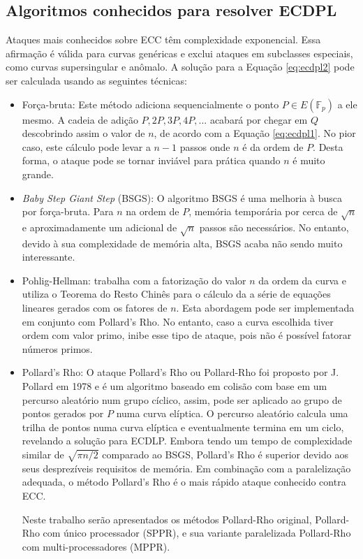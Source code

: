 %
%
\subsection{Algoritmos conhecidos para resolver ECDPL}
Ataques mais conhecidos sobre ECC têm complexidade exponencial. Essa afirmação é válida para curvas genéricas e exclui ataques em subclasses especiais, como curvas supersingular e anômalo. A solução para a Equação \ref{eq:ecdpl2} pode ser calculada usando as seguintes técnicas: \cite{Pelzl:2006}

\begin{itemize}
\item Força-bruta: Este método adiciona sequencialmente o ponto $P \in E(\mathbb{F}_p)$ a ele mesmo. A cadeia de adição $P, 2P, 3P, 4P, ...$ acabará por chegar em \(Q\) descobrindo assim o valor de \(n\), de acordo com a Equação \ref{eq:ecdpl1}. No pior caso, este cálculo pode levar a $n - 1$ passos onde \(n\) é da ordem de \(P\). Desta forma, o ataque pode se tornar inviável para prática quando \(n\) é muito grande.
\item \textit{Baby Step Giant Step} (BSGS): O algoritmo BSGS é uma melhoria à busca por força-bruta. Para \(n\) na ordem de \(P\), memória temporária por cerca de $\sqrt{n}$ e aproximadamente um adicional de $\sqrt{n}$ passos são necessários. No entanto, devido à sua complexidade de memória alta, BSGS acaba não sendo muito interessante.
\item Pohlig-Hellman: trabalha com a fatorização do valor \(n\) da ordem da curva e utiliza o Teorema do Resto Chinês para o cálculo da a série de equações lineares gerados com os fatores de \(n\). Esta abordagem pode ser implementada em conjunto com Pollard's Rho. No entanto, caso a curva escolhida tiver ordem com valor primo, inibe esse tipo de ataque, pois não é possível fatorar números primos.
\item Pollard's Rho: O ataque Pollard's Rho ou Pollard-Rho foi proposto por J. Pollard em 1978 e é um algoritmo baseado em colisão com base em um percurso aleatório num grupo cíclico, assim, pode ser aplicado ao grupo de pontos gerados por \(P\) numa curva elíptica. O percurso aleatório calcula uma trilha de pontos numa curva elíptica e eventualmente termina em um ciclo, revelando a solução para ECDLP. \cite{Pollard:1978} Embora tendo um tempo de complexidade similar de $\sqrt{\pi n/2}$ comparado ao BSGS, Pollard's Rho é superior devido aos seus desprezíveis requisitos de memória. Em combinação com a paralelização adequada, o método Pollard's Rho é o mais rápido ataque conhecido contra ECC. \cite{Pelzl:2006}

Neste trabalho serão apresentados os métodos Pollard-Rho original, Pollard-Rho com único processador (SPPR), e sua variante paralelizada Pollard-Rho com multi-processadores (MPPR).
\end{itemize}

